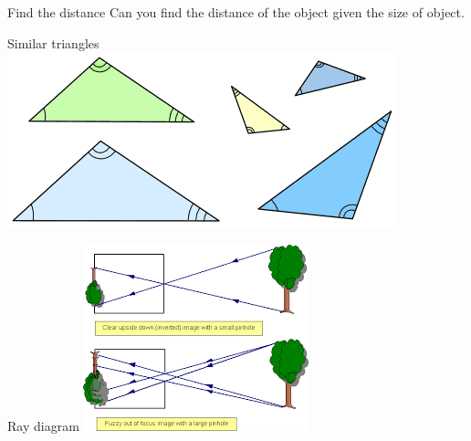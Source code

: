 \begin{frame}{Find the distance }
  Can you find the distance of the object given the size of object.
\end{frame}

\begin{frame}{Similar triangles}
  \includegraphics[width=\textwidth]{media/tri-similar1.png}
\end{frame}

\begin{frame}{Ray diagram}
  \includegraphics[width=\textwidth]{media/pinhole_blurred.png}
\end{frame}

